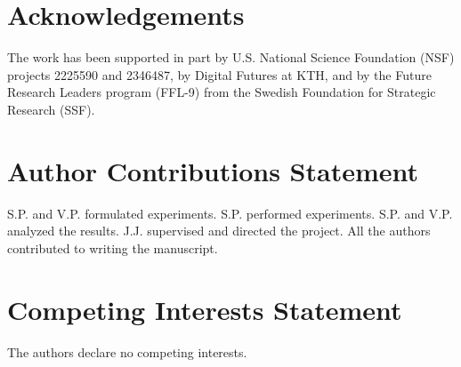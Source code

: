 \documentclass[fleqn,10pt]{wlscirep}
\begin{document}
\section*{Acknowledgements}
The work has been supported in part by U.S. National Science Foundation (NSF) projects 2225590 and 2346487, by Digital Futures at KTH, and by the Future Research Leaders program (FFL-9) from the Swedish Foundation for Strategic Research (SSF).

\section*{Author Contributions Statement}
S.P. and V.P. formulated experiments. S.P. performed experiments. S.P. and V.P. analyzed the results. J.J. supervised and directed the project. All the authors contributed to writing the manuscript.

\section*{Competing Interests Statement}
The authors declare no competing interests.


\end{document}
